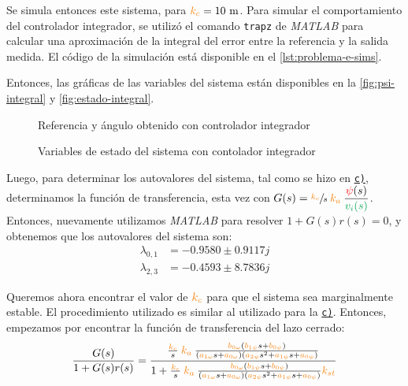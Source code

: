 Se simula entonces este sistema, para $\nara{k_{c}} = 10\ \unit{m}$. Para simular
el comportamiento del controlador integrador, se utilizó el comando \verb|trapz|
de \textit{MATLAB} para calcular una aproximación de la integral del error entre
la referencia y la salida medida. El código de la simulación está disponible en
el \autoref{lst:problema-e-sims}.

Entonces, las gráficas de las variables del sistema están disponibles en la
\autoref{fig:psi-integral} y \autoref{fig:estado-integral}.

\begin{figure}[h]
  \centering
  
  \caption{Referencia y ángulo obtenido con controlador integrador}\label{fig:psi-integral}
\end{figure}

\begin{figure}[h]
  \centering
  
  \caption{Variables de estado del sistema con contolador integrador}\label{fig:estado-integral}
\end{figure}

Luego, para determinar los autovalores del sistema, tal como se hizo en 
\hyperref[pregunta-c]{\texttt{c)}}, determinamos la función de transferencia,
esta vez con $G(s) = \sfrac{\nara{k_{c}}}{s} \nara{k_{a}} \dfrac{\rojo{\psi}(s)}{\verd{v_{i}(s)}}$.
Entonces, nuevamente utilizamos \textit{MATLAB} para resolver $1 + G(s)r(s) = 0$,
y obtenemos que los autovalores del sistema son:
\begin{align*}
  \lambda_{0,1} &= -0.9580 \pm 0.9117j \\
  \lambda_{2,3} &= -0.4593 \pm 8.7836j
\end{align*}

\FloatBarrier

Queremos ahora encontrar el valor de $\nara{k_c}$ para que el sistema sea
marginalmente estable. El procedimiento utilizado es similar al utilizado para la
\hyperref[pregunta-c]{\texttt{c)}}. Entonces, empezamos por encontrar la función
de transferencia del lazo cerrado:
\begin{equation}
  \frac{G(s)}{1 + G(s)r(s)} = \dfrac{\frac{\nara{k_c}}{s}\nara{k_a} \frac{\nara{\nara{b_{0\omega}}}\left(\nara{b_{1\psi}}s + \nara{b_{0\psi}}\right)}
  {\left(\nara{a_{1\omega}}s + \nara{a_{0\omega}}\right)\left(\nara{a_{2\psi}}s^{2} + \nara{a_{1\psi}}s + \nara{a_{0\psi}}\right)}}
  {1+\frac{\nara{k_c}}{s} \nara{k_a} \frac{\nara{\nara{b_{0\omega}}}\left(\nara{b_{1\psi}}s + \nara{b_{0\psi}}\right)}
  {\left(\nara{a_{1\omega}}s + \nara{a_{0\omega}}\right)\left(\nara{a_{2\psi}}s^{2} + \nara{a_{1\psi}}s + \nara{a_{0\psi}}\right)}\nara{k_{st}}}
\end{equation}

